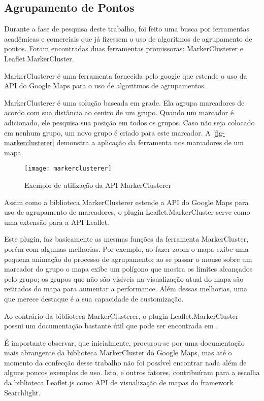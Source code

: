\subsection{Agrupamento de Pontos\label{sec:markercluster}}
		Durante a fase de pesquisa deste trabalho, foi feito uma busca por ferramentas acadêmicas e comerciais que já fizessem o uso de algoritmos de agrupamento de pontos. Foram encontradas duas ferramentas promissoras: MarkerClusterer e Leaflet.MarkerCluster.
		
		
		MarkerClusterer \cite[p. 188]{livroGoogleApiV3} é uma ferramenta fornecida pelo google que estende o uso da API do Google Maps para o uso de algoritmos de agrupamentos.
		
		MarkerClusterer é uma solução baseada em grade. Ela agrupa marcadores de acordo com sua distância ao centro de um grupo. Quando um marcador é adicionado, ele pesquisa sua posição em todos os grupos. Caso não seja colocado em nenhum grupo, um novo grupo é criado para este marcador. A \autoref{fig-markerclusterer} demonstra a aplicação da ferramenta nos marcadores de um mapa.
	\begin{figure}[htb]
	\caption{\label{fig-markerclusterer}Exemplo de utilização da API MarkerClusterer }
	\begin{center}
	    \texttt{[image: markerclusterer]}
	\end{center}
\end{figure}

		Assim como a biblioteca MarkerClusterer estende a API do Google Maps para uso de agrupamento de marcadores, o plugin Leaflet.MarkerCluster\cite{gitleafletmarker} serve como uma extensão para a API Leaflet. 
		
		Este plugin, faz basicamente as mesmas funções da ferramenta MarkerCluster, porém com algumas melhorias. Por exemplo, ao fazer zoom o mapa exibe uma pequena animação do processo de agrupamento; ao se passar o mouse sobre um marcador do grupo o mapa exibe um polígono que mostra os limites alcançados pelo grupo; os grupos que não são visíveis  na visualização atual do mapa são retirados do mapa para aumentar a performance. Além dessas melhorias, uma que merece destaque é a sua capacidade de customização. 

		Ao contrário da biblioteca MarkerClusterer, o plugin Leaflet.MarkerCluster possui um documentação bastante útil que pode ser encontrada em \cite{gitleafletmarker}. 
		
		É importante observar, que inicialmente, procurou-se por uma documentação mais abrangente da biblioteca MarkerCluster do Google Maps, mas até o momento da confecção desse trabalho não foi possível encontrar nada além de alguns poucos exemplos de uso. Isto, e outros fatores, contribuíram para a escolha da biblioteca Leaflet.js como API de visualização de mapas do framework Searchlight.

